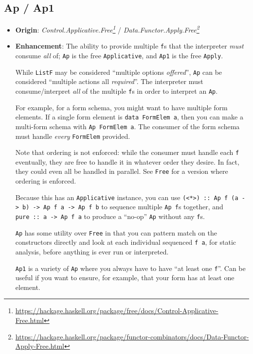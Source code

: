 \documentclass[]{article}
\renewcommand{\href}[2]{#2\footnote{\url{#1}}}
\begin{document}
\hypertarget{ap-ap1}{%
\subsection{Ap / Ap1}\label{ap-ap1}}

\begin{itemize}
\item
  \textbf{Origin}:
  \emph{\href{https://hackage.haskell.org/package/free/docs/Control-Applicative-Free.html}{Control.Applicative.Free}}
  /
  \emph{\href{https://hackage.haskell.org/package/functor-combinators/docs/Data-Functor-Apply-Free.html}{Data.Functor.Apply.Free}}
\item
  \textbf{Enhancement}: The ability to provide multiple \texttt{f}s that the
  interpreter \emph{must} consume \emph{all} of; \texttt{Ap} is the free
  \texttt{Applicative}, and \texttt{Ap1} is the free \texttt{Apply}.

  While \texttt{ListF} may be considered ``multiple options \emph{offered}'',
  \texttt{Ap} can be considered ``multiple actions all \emph{required}''. The
  interpreter must consume/interpret \emph{all} of the multiple \texttt{f}s in
  order to interpret an \texttt{Ap}.

  For example, for a form schema, you might want to have multiple form elements.
  If a single form element is \texttt{data\ FormElem\ a}, then you can make a
  multi-form schema with \texttt{Ap\ FormElem\ a}. The consumer of the form
  schema must handle \emph{every} \texttt{FormElem} provided.

  Note that ordering is not enforced: while the consumer must handle each
  \texttt{f} eventually, they are free to handle it in whatever order they
  desire. In fact, they could even all be handled in parallel. See \texttt{Free}
  for a version where ordering is enforced.

  Because this has an \texttt{Applicative} instance, you can use
  \texttt{(\textless{}*\textgreater{})\ ::\ Ap\ f\ (a\ -\textgreater{}\ b)\ -\textgreater{}\ Ap\ f\ a\ -\textgreater{}\ Ap\ f\ b}
  to sequence multiple \texttt{Ap\ f}s together, and
  \texttt{pure\ ::\ a\ -\textgreater{}\ Ap\ f\ a} to produce a ``no-op''
  \texttt{Ap} without any \texttt{f}s.

  \texttt{Ap} has some utility over \texttt{Free} in that you can pattern match
  on the constructors directly and look at each individual sequenced
  \texttt{f\ a}, for static analysis, before anything is ever run or
  interpreted.

  \texttt{Ap1} is a variety of \texttt{Ap} where you always have to have ``at
  least one \texttt{f}''. Can be useful if you want to ensure, for example, that
  your form has at least one element.


\end{itemize}
\end{document}
